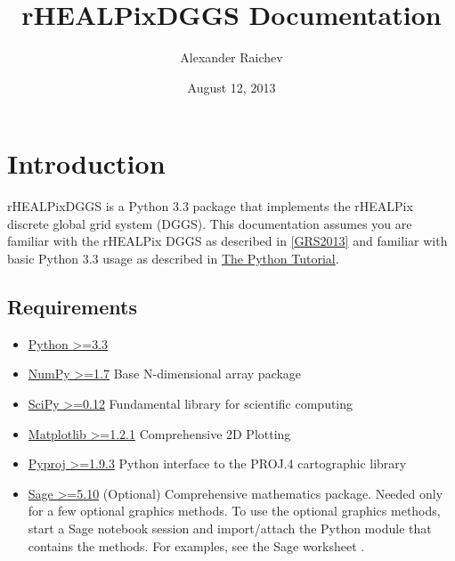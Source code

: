 \documentclass[a4paper,12ptopenany,oneside]{sphinxmanual}
\title{rHEALPixDGGS Documentation}
\date{August 12, 2013}
\author{Alexander Raichev}
\begin{document}
\maketitle
\tableofcontents
{}\label{index::doc}



\chapter{Introduction}
\label{introduction::doc}\label{introduction:welcome-the-rhealpixdggs-documentation}\label{introduction:introduction}
rHEALPixDGGS is a Python 3.3 package that implements the rHEALPix discrete global grid system (DGGS).
This documentation assumes you are familiar with the rHEALPix DGGS as described in {\hyperref[introduction:grs2013]{{[}GRS2013{]}}} and familiar with basic Python 3.3 usage as described in \href{http://docs.python.org/3/tutorial/}{The Python Tutorial}.


\section{Requirements}
\label{introduction:requirements}\begin{itemize}
\item {} 
\href{http://python.org/}{Python \textgreater{}=3.3}

\item {} 
\href{http://www.numpy.org/}{NumPy \textgreater{}=1.7} Base N-dimensional array package

\item {} 
\href{http://www.scipy.org/}{SciPy \textgreater{}=0.12} Fundamental library for scientific computing

\item {} 
\href{http://matplotlib.org/}{Matplotlib \textgreater{}=1.2.1} Comprehensive 2D Plotting

\item {} 
\href{http://code.google.com/p/pyproj/}{Pyproj \textgreater{}=1.9.3}
Python interface to the PROJ.4 cartographic library

\item {} 
\href{http://www.sagemath.org}{Sage \textgreater{}=5.10}
(Optional) Comprehensive mathematics package.
Needed only for a few optional graphics methods.
To use the optional graphics methods, start a Sage notebook session and import/attach the Python module that contains the methods.
For examples, see the Sage worksheet .

\end{itemize}
\end{document}
